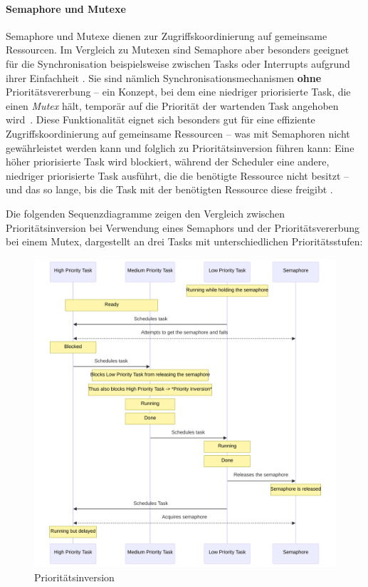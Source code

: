 \paragraph{Semaphore und Mutexe} \label{sec:mutex}

Semaphore und Mutexe dienen zur Zugriffskoordinierung auf gemeinsame Ressourcen.
Im Vergleich zu Mutexen sind Semaphore aber besonders geeignet für die
Synchronisation beispielsweise zwischen Tasks oder Interrupts aufgrund ihrer
Einfachheit \cite{freertos_semphr_doc}. Sie sind nämlich
Synchronisationsmechanismen \textbf{ohne} Prioritätsvererbung -- ein Konzept,
bei dem eine niedriger priorisierte Task, die einen \textit{Mutex} hält,
temporär auf die Priorität der wartenden Task angehoben
wird~\cite{wikipedia_priority_inheritance}. Diese Funktionalität eignet sich
besonders gut für eine effiziente Zugriffskoordinierung auf gemeinsame
Ressourcen -- was mit Semaphoren nicht gewährleistet werden kann und folglich zu
Prioritätsinversion führen kann: Eine höher priorisierte Task wird blockiert,
während der Scheduler eine andere, niedriger priorisierte Task ausführt, die die
benötigte Ressource nicht besitzt -- und das so lange, bis die Task mit der
benötigten Ressource diese freigibt \cite{wikipedia_priority_inversion}.

Die folgenden Sequenzdiagramme zeigen den Vergleich zwischen Prioritätsinversion
bei Verwendung eines Semaphors und der Prioritätsvererbung bei einem Mutex,
dargestellt an drei Tasks mit unterschiedlichen Prioritätsstufen:

\begin{figure}[H]
    \centering
    \includegraphics[width=1\textwidth]{assets/prio_inversion}
    \caption{Prioritätsinversion}
\end{figure}

